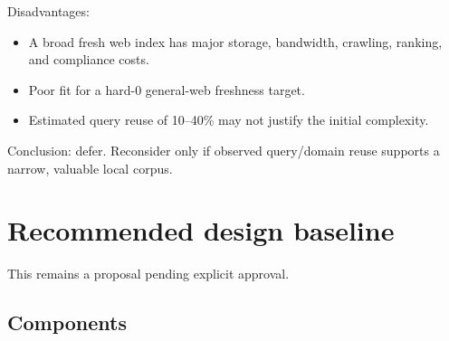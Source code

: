 \documentclass[11pt]{article}
\begin{document}
Disadvantages:

\begin{itemize}
\item A broad fresh web index has major storage, bandwidth, crawling, ranking, and
compliance costs.
\item Poor fit for a hard-0 general-web freshness target.
\item Estimated query reuse of 10--40\% may not justify the initial complexity.
\end{itemize}

Conclusion: defer.  Reconsider only if observed query/domain reuse supports a
narrow, valuable local corpus.
\section*{Recommended design baseline}
\label{sec:org3791195}

This remains a proposal pending explicit approval.
\subsection*{Components}
\label{sec:orgdc96810}
\end{document}
